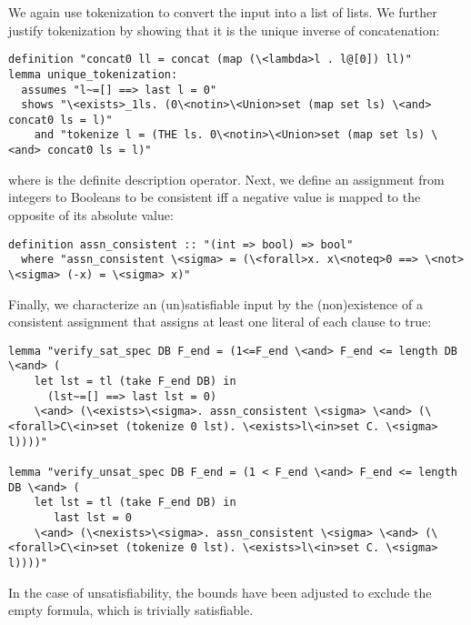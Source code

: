 \documentclass[smallcondensed]{svjour3}     %
\makeatletter
\newcommand{\isai}{\lstinline[language=isabelle,basicstyle=\normalsize\ttfamily\slshape]}
\renewcommand\lstinline[1][]{%
  \leavevmode
  \ifmmode\expandafter\hbox\fi\bgroup
    \def\lst@boxpos{b}%
    \lsthk@PreSet\lstset{flexiblecolumns,#1}%
    \lsthk@TextStyle
    \@ifnextchar\bgroup{\afterassignment\lst@InlineG \let\@let@token}%
                       \lstinline@}
\makeatother
\begin{document}
We again use tokenization to convert the input into a list of lists. 
We further justify tokenization by showing that it is the unique inverse of concatenation:
\begin{lstlisting}
definition "concat0 ll = concat (map (\<lambda>l . l@[0]) ll)"
lemma unique_tokenization: 
  assumes "l~=[] ==> last l = 0"
  shows "\<exists>_1ls. (0\<notin>\<Union>set (map set ls) \<and> concat0 ls = l)"
    and "tokenize l = (THE ls. 0\<notin>\<Union>set (map set ls) \<and> concat0 ls = l)"
\end{lstlisting}
where \isai{THE} is the definite description operator.
Next, we define an assignment from integers to Booleans to be consistent iff a negative value is mapped 
to the opposite of its absolute value:
\begin{lstlisting}
definition assn_consistent :: "(int => bool) => bool"
  where "assn_consistent \<sigma> = (\<forall>x. x\<noteq>0 ==> \<not> \<sigma> (-x) = \<sigma> x)"
\end{lstlisting}
Finally, we characterize an (un)satisfiable input by the (non)existence of a consistent assignment that assigns at least one literal of each clause to true:
\begin{lstlisting}
lemma "verify_sat_spec DB F_end = (1<=F_end \<and> F_end <= length DB \<and> (
    let lst = tl (take F_end DB) in 
      (lst~=[] ==> last lst = 0)
    \<and> (\<exists>\<sigma>. assn_consistent \<sigma> \<and> (\<forall>C\<in>set (tokenize 0 lst). \<exists>l\<in>set C. \<sigma> l))))"
    
lemma "verify_unsat_spec DB F_end = (1 < F_end \<and> F_end <= length DB \<and> (
    let lst = tl (take F_end DB) in 
       last lst = 0
    \<and> (\<nexists>\<sigma>. assn_consistent \<sigma> \<and> (\<forall>C\<in>set (tokenize 0 lst). \<exists>l\<in>set C. \<sigma> l))))"
\end{lstlisting}
In the case of unsatisfiability, the bounds have been adjusted to exclude the empty formula, which is trivially satisfiable.
\end{document}
